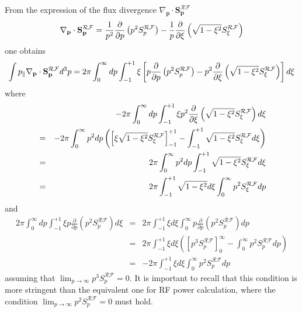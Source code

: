 From the expression of the flux divergence $\nabla _{\mathbf{p}}\cdot
\mathbf{S}_{\mathbf{p}}^{\mathcal{RF}}$%
\begin{equation}
\nabla _{\mathbf{p}}\cdot \mathbf{S}_{\mathbf{p}}^{\mathcal{RF}}=\frac{1}{
p^{2}}\frac{\partial }{\partial p}\left( p^{2}S_{p}^{\mathcal{RF}}\right) -%
\frac{1}{p}\frac{\partial }{\partial \xi }\left( \sqrt{1-\xi ^{2}}S_{\xi }^{%
\mathcal{RF}}\right)
\end{equation}
one obtains
\begin{equation}
\int p_{\Vert }\mathbf{\nabla }_{\mathbf{p}}\cdot \mathbf{S}_{\mathbf{p}}^{%
\mathcal{RF}}d^{3}p=2\pi \int_{0}^{\infty }dp\int_{-1}^{+1}\xi \left[ p\frac{
\partial }{\partial p}\left( p^{2}S_{p}^{\mathcal{RF}}\right) -p^{2}\frac{
\partial }{\partial \xi }\left( \sqrt{1-\xi ^{2}}S_{\xi }^{\mathcal{RF}
}\right) \right] d\xi
\end{equation}
where
\begin{eqnarray}
&&-2\pi \int_{0}^{\infty }dp\int_{-1}^{+1}\xi p^{2}\frac{\partial }{\partial
\xi }\left( \sqrt{1-\xi ^{2}}S_{\xi }^{\mathcal{RF}}\right) d\xi  \nonumber
\\
&=&-2\pi \int_{0}^{\infty }p^{2}dp\left( \left[ \xi \sqrt{1-\xi ^{2}}S_{\xi
}^{\mathcal{RF}}\right] _{-1}^{+1}-\int_{-1}^{+1}\sqrt{1-\xi ^{2}}S_{\xi }^{%
\mathcal{RF}}d\xi \right)  \nonumber \\
&=&2\pi \int_{0}^{\infty }p^{2}dp\int_{-1}^{+1}\sqrt{1-\xi ^{2}}S_{\xi }^{%
\mathcal{RF}}d\xi  \nonumber \\
&=&2\pi \int_{-1}^{+1}\sqrt{1-\xi ^{2}}d\xi \int_{0}^{\infty }p^{2}S_{\xi }^{%
\mathcal{RF}}dp
\end{eqnarray}
and
\begin{eqnarray}
2\pi \int_{0}^{\infty }dp\int_{-1}^{+1}\xi p\frac{\partial }{\partial p}
\left( p^{2}S_{p}^{\mathcal{RF}}\right) d\xi &=&2\pi \int_{-1}^{+1}\xi d\xi
\int_{0}^{\infty }p\frac{\partial }{\partial p}\left( p^{2}S_{p}^{\mathcal{RF%
}}\right) dp  \nonumber \\
&=&2\pi \int_{-1}^{+1}\xi d\xi \left( \left[ p^{3}S_{p}^{\mathcal{RF}
}\right] _{0}^{\infty }-\int_{0}^{\infty }p^{2}S_{p}^{\mathcal{RF}}dp\right)
\nonumber \\
&=&-2\pi \int_{-1}^{+1}\xi d\xi \int_{0}^{\infty }p^{2}S_{p}^{\mathcal{RF}}dp
\end{eqnarray}
assuming that $\lim_{p\rightarrow \infty }p^{3}S_{p}^{\mathcal{RF}}=0.$ It
is important to recall that this condition is more stringent than the
equivalent one for RF power calculation, where the condition $%
\lim_{p\rightarrow \infty }p^{2}S_{p}^{\mathcal{RF}}=0$ must hold.

